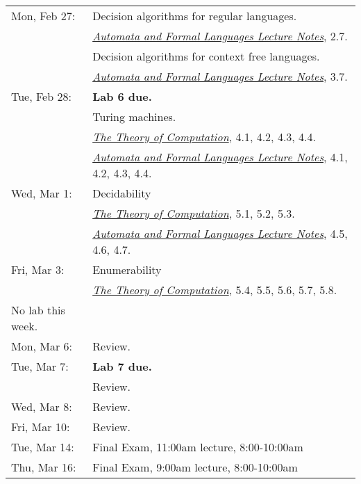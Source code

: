 \documentclass{article}
\newcommand{\theory}
           {\href{http://cg.scs.carleton.ca/~michiel/TheoryOfComputation/}
             {{\em The Theory of Computation}}}
\newcommand{\automata}
           {\href{http://users.utu.fi/jkari/automata/}
             {{\em Automata and Formal Languages Lecture Notes}}}
\begin{document}
\begin{longtable}{ll}
Mon, Feb 27:
& Decision algorithms for regular languages. \\&\automata, 2.7.
\\& Decision algorithms for context free languages. \\&\automata, 3.7.
\\
Tue, Feb 28:
& {\bf Lab 6 due.}
\\& Turing machines.
\\& \theory, 4.1, 4.2, 4.3, 4.4.
\\& \automata, 4.1, 4.2, 4.3, 4.4.
\\
Wed, Mar 1:
& Decidability
\\& \theory, 5.1, 5.2, 5.3.
\\& \automata, 4.5, 4.6, 4.7.
\\
Fri, Mar 3:
& Enumerability
\\&\theory, 5.4, 5.5, 5.6, 5.7, 5.8.
\\\hline
No lab this week.
\\
Mon, Mar 6:& Review.
\\
Tue, Mar 7:& {\bf Lab 7 due.}
\\& Review.
\\
Wed, Mar 8:&  Review.
\\
Fri, Mar 10: & Review.
\\\hline
Tue, Mar 14: &  Final Exam, 11:00am lecture, 8:00-10:00am
\\
Thu, Mar 16: &  Final Exam, 9:00am lecture, 8:00-10:00am
\end{longtable}
\end{document}
